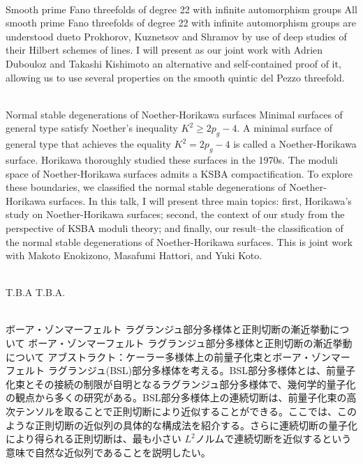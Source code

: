\documentclass[dvipdfmx,a4paper,12pt]{article}
\theoremstyle{plain} %
\theoremstyle{definition} %
\begin{document}
\vskip3mm
\\
Smooth prime Fano threefolds of degree 22 with infinite automorphism groups 
\vskip3mm
All smooth prime Fano threefolds of degree 22 with infinite automorphism groups
are understood dueto Prokhorov, Kuznetsov and Shramov by use of deep studies of
their Hilbert schemes of lines. I will present as our joint work with
Adrien Dubouloz and Takashi Kishimoto an alternative and self-contained
proof of it, allowing us to use several properties on
the smooth quintic del Pezzo threefold. 

\vskip8mm

\\
Normal stable degenerations of Noether-Horikawa surfaces
\vskip3mm
Minimal surfaces of general type satisfy Noether's inequality $K^2 \geq 2p_g - 4$. A minimal surface of general type that achieves the equality $K^2 = 2p_g - 4$ is called a Noether-Horikawa surface. Horikawa thoroughly studied these surfaces in the 1970s.
The moduli space of Noether-Horikawa surfaces admits a KSBA compactification. To explore these boundaries, we classified the normal stable degenerations of Noether-Horikawa surfaces.
In this talk, I will present three main topics: first, Horikawa's study on Noether-Horikawa surfaces; second, the context of our study from the perspective of KSBA moduli theory; and finally, our result--the classification of the normal stable degenerations of Noether-Horikawa surfaces.
This is joint work with Makoto Enokizono, Masafumi Hattori, and Yuki Koto.
\vskip8mm
\newpage

\\
T.B.A
\vskip3mm
T.B.A.
\vskip8mm


\\
ボーア・ゾンマーフェルト ラグランジュ部分多様体と正則切断の漸近挙動について
\vskip3mm
ボーア・ゾンマーフェルト ラグランジュ部分多様体と正則切断の漸近挙動について
アブストラクト：ケーラー多様体上の前量子化束とボーア・ゾンマーフェルト ラグランジュ(BSL)部分多様体を考える。BSL部分多様体とは、前量子化束とその接続の制限が自明となるラグランジュ部分多様体で、幾何学的量子化の観点から多くの研究がある。BSL部分多様体上の連続切断は、前量子化束の高次テンソルを取ることで正則切断により近似することができる。ここでは、このような正則切断の近似列の具体的な構成法を紹介する。さらに連続切断の量子化により得られる正則切断は、最も小さい $L^2$ノルムで連続切断を近似するという意味で自然な近似列であることを説明したい。
\vskip8mm
\end{document}
